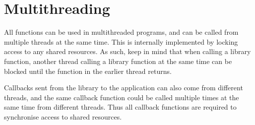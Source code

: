 \section{Multithreading}
All functions can be used in multithreaded programs, and can be called from multiple threads at the same time. This is internally implemented by locking access to any shared resources. As such, keep in mind that when calling a library function, another thread calling a library function at the same time can be blocked until the function in the earlier thread returns.

Callbacks sent from the library to the application can also come from  different threads, and the same callback function could be called multiple times at the same time from different threads. Thus all callback functions are required to synchronise access to shared resources.

